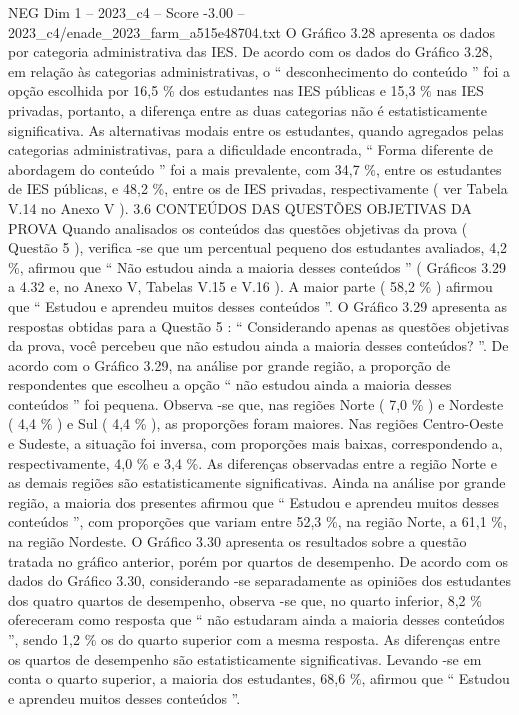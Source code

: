 \begin{textsample}{NEG Dim 1 – 2023\_c4 – Score -3.00 – 2023\_c4/enade\_2023\_farm\_a515e48704.txt}
O Gráfico 3.28 apresenta os dados por categoria administrativa das IES.
De acordo com os dados do Gráfico 3.28, em relação às categorias administrativas, o “ desconhecimento do conteúdo ” foi a opção escolhida por 16,5 \% dos estudantes nas IES públicas e 15,3 \% nas IES privadas, portanto, a diferença entre as duas categorias não é estatisticamente significativa.
As alternativas modais entre os estudantes, quando agregados pelas categorias administrativas, para a dificuldade encontrada, “ Forma diferente de abordagem do conteúdo ” foi a mais prevalente, com 34,7 \%, entre os estudantes de IES públicas, e 48,2 \%, entre os de IES privadas, respectivamente ( ver Tabela V.14 no Anexo V ). 3.6 CONTEÚDOS DAS QUESTÕES OBJETIVAS DA PROVA Quando analisados os conteúdos das questões objetivas da prova ( Questão 5 ), verifica -se que um percentual pequeno dos estudantes avaliados, 4,2 \%, afirmou que “ Não estudou ainda a maioria desses conteúdos ” ( Gráficos 3.29 a 4.32 e, no Anexo V, Tabelas V.15 e V.16 ).
A maior parte ( 58,2 \% ) afirmou que “ Estudou e aprendeu muitos desses conteúdos ”.
O Gráfico 3.29 apresenta as respostas obtidas para a Questão 5 : “ Considerando apenas as questões objetivas da prova, você percebeu que não estudou ainda a maioria desses conteúdos? ”.
De acordo com o Gráfico 3.29, na análise por grande região, a proporção de respondentes que escolheu a opção “ não estudou ainda a maioria desses conteúdos ” foi pequena.
Observa -se que, nas regiões Norte ( 7,0 \% ) e Nordeste ( 4,4 \% ) e Sul ( 4,4 \% ), as proporções foram maiores.
Nas regiões Centro-Oeste e Sudeste, a situação foi inversa, com proporções mais baixas, correspondendo a, respectivamente, 4,0 \% e 3,4 \%.
As diferenças observadas entre a região Norte e as demais regiões são estatisticamente significativas.
Ainda na análise por grande região, a maioria dos presentes afirmou que “ Estudou e aprendeu muitos desses conteúdos ”, com proporções que variam entre 52,3 \%, na região Norte, a 61,1 \%, na região Nordeste.
O Gráfico 3.30 apresenta os resultados sobre a questão tratada no gráfico anterior, porém por quartos de desempenho.
De acordo com os dados do Gráfico 3.30, considerando -se separadamente as opiniões dos estudantes dos quatro quartos de desempenho, observa -se que, no quarto inferior, 8,2 \% ofereceram como resposta que “ não estudaram ainda a maioria desses conteúdos ”, sendo 1,2 \% os do quarto superior com a mesma resposta.
As diferenças entre os quartos de desempenho são estatisticamente significativas.
Levando -se em conta o quarto superior, a maioria dos estudantes, 68,6 \%, afirmou que “ Estudou e aprendeu muitos desses conteúdos ”.

\end{textsample}

